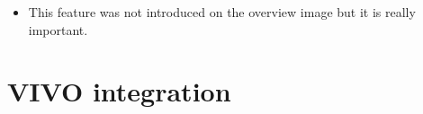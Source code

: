 \begin{itemize}
	\item This feature was not introduced on the overview image but it is really important.
\end{itemize}




\section{VIVO integration} \label{523}

